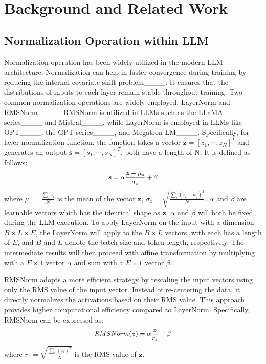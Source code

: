 \section{Background and Related Work}
\label{sec:background}
\subsection{Normalization Operation within LLM}
\label{sec:layernorm}

Normalization operation has been widely utilized in the modern LLM architecture. Normalization can help in faster convergence during training by reducing the internal covariate shift problem____. It ensures that the distributions of inputs to each layer remain stable throughout training. Two common normalization operations are widely employed: LayerNorm and RMSNorm____. RMSNorm is utilized in LLMs such as the LLaMA series____ and Mistral____, while LayerNorm is employed in LLMs like OPT____, the GPT series____, and Megatron-LM____.
Specifically, for layer normalization function, the function takes a vector $\boldsymbol{z}=[z_1,\cdots,z_N]^T$ and generates an output $\boldsymbol{s}=[s_1,\cdots,s_N]^T$, both have a length of N. It is defined as follows:
\begin{equation}
\label{eqn:layernorm}
\small
\boldsymbol{s}=\alpha\frac{\boldsymbol{z}-\mu_{z}}{\sigma_{z}} + \beta
\end{equation}
where $\mu_{z}=\frac{\sum_{i} z_{i}}{N}$ is the mean of the vector $\boldsymbol{z}$, $\sigma_{z} = \sqrt{\frac{\sum_{i} (z_{i}-\mu_{z})^{2}}{N}}$. $\alpha$ and $\beta$ are learnable vectors which has the identical shape as $\boldsymbol{z}$. $\alpha$ and $\beta$ will both be fixed during the LLM execution. To apply LayerNorm on the input with a dimension $B\times L\times E$, the LayerNorm will apply to the $B\times L$ vectors, with each has a length of $E$, and $B$ and $L$ denote the batch size and token length, respectively. The intermediate results will then proceed with affine transformation by multiplying with a $E\times 1$ vector $\alpha$ and sum with a $E\times 1$ vector $\beta$.

RMSNorm adopts a more efficient strategy by rescaling the input vectors using only the RMS value of the input vector. Instead of re-centering the data, it directly normalizes the activations based on their RMS value. This approach provides higher computational efficiency compared to LayerNorm. Specifically, RMSNorm can be expressed as:
\begin{equation}
\label{eqn:rmsnorm}
\small
RMSNorm(\boldsymbol{z})=\alpha\frac{\boldsymbol{z}}{r_{z}} + \beta
\end{equation}
where $r_{z} = \sqrt{\frac{\sum_{i} (z_{i})^{2}}{N}}$ is the RMS value of $\boldsymbol{z}$.


